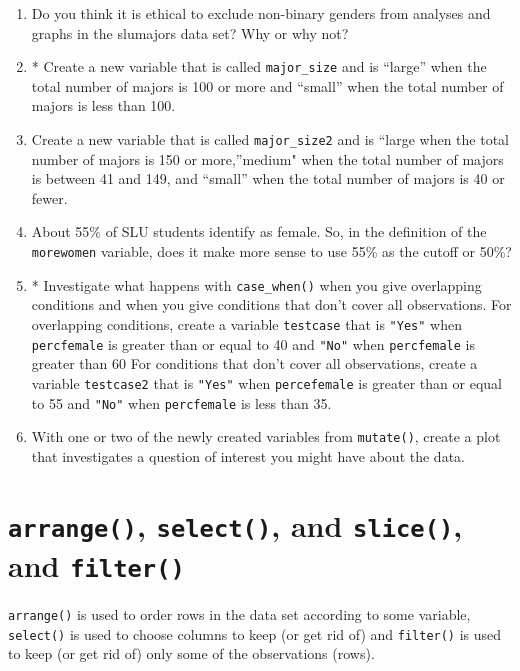 \documentclass[
]{book}
\begin{document}
\begin{enumerate}
\def\labelenumi{\arabic{enumi}.}
\item
  Do you think it is ethical to exclude non-binary genders from analyses and graphs in the slumajors data set? Why or why not?
\item
  * Create a new variable that is called \texttt{major\_size} and is ``large'' when the total number of majors is 100 or more and ``small'' when the total number of majors is less than 100.
\item
  Create a new variable that is called \texttt{major\_size2} and is ``large when the total number of majors is 150 or more,''medium" when the total number of majors is between 41 and 149, and ``small'' when the total number of majors is 40 or fewer.
\item
  About 55\% of SLU students identify as female. So, in the definition of the \texttt{morewomen} variable, does it make more sense to use 55\% as the cutoff or 50\%?
\item
  * Investigate what happens with \texttt{case\_when()} when you give overlapping conditions and when you give conditions that don't cover all observations. For overlapping conditions, create a variable \texttt{testcase} that is \texttt{"Yes"} when \texttt{percfemale} is greater than or equal to 40 and \texttt{"No"} when \texttt{percfemale} is greater than 60 For conditions that don't cover all observations, create a variable \texttt{testcase2} that is \texttt{"Yes"} when \texttt{percefemale} is greater than or equal to 55 and \texttt{"No"} when \texttt{percfemale} is less than 35.
\item
  With one or two of the newly created variables from \texttt{mutate()}, create a plot that investigates a question of interest you might have about the data.
\end{enumerate}

\hypertarget{arrange-select-and-slice-and-filter}{%
\section{\texorpdfstring{\texttt{arrange()}, \texttt{select()}, and \texttt{slice()}, and \texttt{filter()}}{arrange(), select(), and slice(), and filter()}}\label{arrange-select-and-slice-and-filter}}

\texttt{arrange()} is used to order rows in the data set according to some variable, \texttt{select()} is used to choose columns to keep (or get rid of) and \texttt{filter()} is used to keep (or get rid of) only some of the observations (rows).
\end{document}
